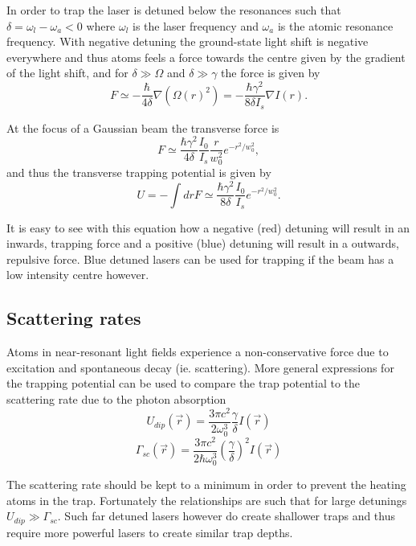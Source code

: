 In order to trap the laser is detuned below the resonances such that $\delta = \omega_l - \omega_a < 0$ where $\omega_l$ is the laser frequency and $\omega_a$ is the atomic resonance frequency. With negative detuning the ground-state light shift is negative everywhere and thus atoms feels a force towards the centre given by the gradient of the light shift, and for $\delta \gg \Omega$ and $\delta \gg \gamma$ the force is given by
\begin{equation}
F \simeq - \frac{\hbar}{4\delta} \nabla(\Omega(r)^2) = -\frac{\hbar \gamma^2}{8\delta I_s} \nabla I (r).
\end{equation}

At the focus of a Gaussian beam the transverse force is
\begin{equation}
F \simeq \frac{\hbar \gamma^2}{4 \delta} \frac{I_0}{I_s} \frac{r}{w_0^2} e^{-r^2/w_0^2},
\end{equation}
and thus the transverse trapping potential is given by
\begin{equation}
U = -\int dr F \simeq \frac{\hbar \gamma^2}{8\delta} \frac{I_0}{I_s} e^{-r^2/w_0^2}.
\end{equation}

It is easy to see with this equation how a negative (red) detuning will result in an inwards, trapping force and a positive (blue) detuning will result in a outwards, repulsive force. Blue detuned lasers can be used for trapping if the beam has a low intensity centre however\cite{davidson_long_1995, lee_raman_1996, ozeri_long_1999, friedman_compression_2000}.

\subsection{Scattering rates}
Atoms in near-resonant light fields experience a non-conservative force due to excitation and spontaneous decay (ie. scattering). More general expressions for the trapping potential can be used to compare the trap potential to the scattering rate due to the photon absorption\cite{grimm_optical_2000}
\begin{equation}
U_{dip}(\vec{r})=\frac{3\pi c^2}{2\omega_0^3} \frac{\gamma}{\delta} I(\vec{r})
\end{equation}
\begin{equation}
\Gamma_{sc}(\vec{r})=\frac{3\pi c^2}{2\hbar \omega_0^3}\left(\frac{\gamma}{\delta}\right)^2 I(\vec{r})
\end{equation}

The scattering rate should be kept to a minimum in order to prevent the heating atoms in the trap. Fortunately the relationships are such that for large detunings $U_{dip}\gg\Gamma_{sc}$. Such far detuned lasers however do create shallower traps and thus require more powerful lasers to create similar trap depths.

